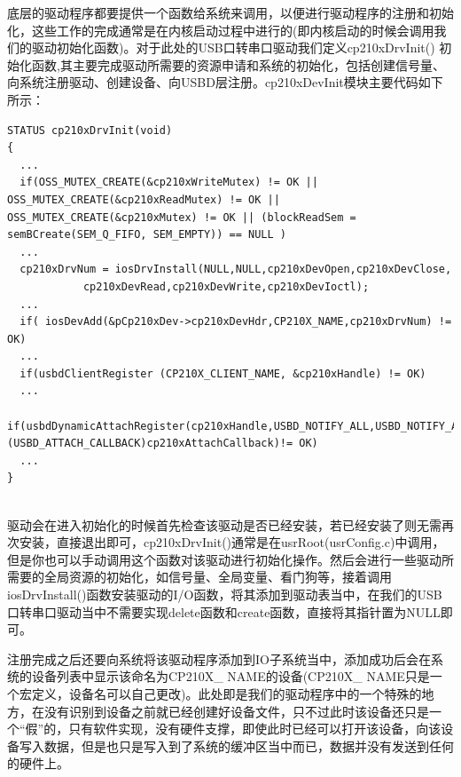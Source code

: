 	底层的驱动程序都要提供一个函数给系统来调用，以便进行驱动程序的注册和初始化，这些工作的完成通常是在内核启动过程中进行的(即内核启动的时候会调用我们的驱动初始化函数)。对于此处的USB口转串口驱动我们定义cp210xDrvInit() 初始化函数,其主要完成驱动所需要的资源申请和系统的初始化，包括创建信号量、向系统注册驱动、创建设备、向USBD层注册。cp210xDevInit模块主要代码如下所示：
\lstset{language=C}
\begin{lstlisting}
STATUS cp210xDrvInit(void)
{
  ...
  if(OSS_MUTEX_CREATE(&cp210xWriteMutex) != OK || OSS_MUTEX_CREATE(&cp210xReadMutex) != OK || OSS_MUTEX_CREATE(&cp210xMutex) != OK || (blockReadSem = semBCreate(SEM_Q_FIFO, SEM_EMPTY)) == NULL )
  ... 	
  cp210xDrvNum = iosDrvInstall(NULL,NULL,cp210xDevOpen,cp210xDevClose,
			cp210xDevRead,cp210xDevWrite,cp210xDevIoctl);
  ...
  if( iosDevAdd(&pCp210xDev->cp210xDevHdr,CP210X_NAME,cp210xDrvNum) != OK)
  ...  
  if(usbdClientRegister (CP210X_CLIENT_NAME, &cp210xHandle) != OK)
  ...  
  if(usbdDynamicAttachRegister(cp210xHandle,USBD_NOTIFY_ALL,USBD_NOTIFY_ALL,USBD_NOTIFY_ALL,TRUE,(USBD_ATTACH_CALLBACK)cp210xAttachCallback)!= OK)
  ...
}
\end{lstlisting}\\

	驱动会在进入初始化的时候首先检查该驱动是否已经安装，若已经安装了则无需再次安装，直接退出即可，cp210xDrvInit()通常是在usrRoot(usrConfig.c)中调用，但是你也可以手动调用这个函数对该驱动进行初始化操作。然后会进行一些驱动所需要的全局资源的初始化，如信号量、全局变量、看门狗等，接着调用iosDrvInstall()函数安装驱动的I/O函数，将其添加到驱动表当中，在我们的USB口转串口驱动当中不需要实现delete函数和create函数，直接将其指针置为NULL即可。
	
	注册完成之后还要向系统将该驱动程序添加到IO子系统当中，添加成功后会在系统的设备列表中显示该命名为CP210X\_ NAME的设备(CP210X\_ NAME只是一个宏定义，设备名可以自己更改)。此处即是我们的驱动程序中的一个特殊的地方，在没有识别到设备之前就已经创建好设备文件，只不过此时该设备还只是一个“假”的，只有软件实现，没有硬件支撑，即使此时已经可以打开该设备，向该设备写入数据，但是也只是写入到了系统的缓冲区当中而已，数据并没有发送到任何的硬件上。

